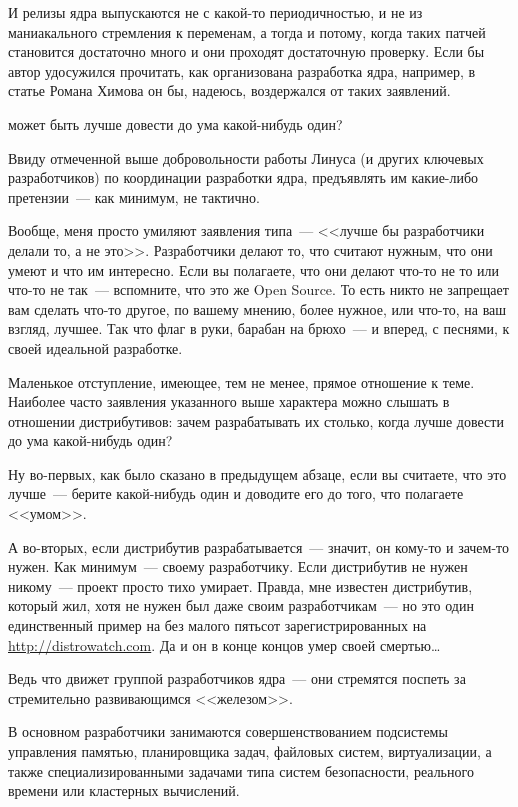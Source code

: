 И релизы ядра выпускаются не с какой-то периодичностью, и не из маниакального стремления к переменам, а тогда и потому, когда таких патчей становится достаточно много и они проходят достаточную проверку. Если бы автор удосужился прочитать, как организована разработка ядра, например, в статье Романа Химова он бы, надеюсь, воздержался от таких заявлений. 
\begin{shadequote}{}
 может быть лучше довести до ума какой-нибудь один?
\end{shadequote}
Ввиду отмеченной выше добровольности работы Линуса (и других ключевых разработчиков) по координации разработки ядра, предъявлять им какие-либо претензии~--- как минимум, не тактично. 

Вообще, меня просто умиляют заявления типа~--- <<лучше бы разработчики делали то, а не это>>. Разработчики делают то, что считают нужным, что они умеют и что им интересно. Если вы полагаете, что они делают что-то не то или что-то не так~--- вспомните, что это же Open Source. То есть никто не запрещает вам сделать что-то другое, по вашему мнению, более нужное, или что-то, на ваш взгляд, лучшее. Так что флаг в руки, барабан на брюхо~--- и вперед, с песнями, к своей идеальной разработке. 

Маленькое отступление, имеющее, тем не менее, прямое отношение к теме. Наиболее часто заявления указанного выше характера можно слышать в отношении дистрибутивов: зачем разрабатывать их столько, когда лучше довести до ума какой-нибудь один? 

Ну во-первых, как было сказано в предыдущем абзаце, если вы считаете, что это лучше~--- берите какой-нибудь один и доводите его до того, что полагаете <<умом>>. 

А во-вторых, если дистрибутив разрабатывается~--- значит, он кому-то и зачем-то нужен. Как минимум~--- своему разработчику. Если дистрибутив не нужен никому~--- проект просто тихо умирает. Правда, мне известен дистрибутив, который жил, хотя не нужен был даже своим разработчикам~--- но это один единственный пример на без малого пятьсот зарегистрированных на \url{http://distrowatch.com}. Да и он в конце концов умер своей смертью\dots
\begin{shadequote}{}
Ведь что движет группой разработчиков ядра~--- они стремятся поспеть за стремительно развивающимся <<железом>>.
\end{shadequote}
В основном разработчики занимаются совершенствованием подсистемы управления памятью, планировщика задач, файловых систем, виртуализации, а также специализированными задачами типа систем безопасности, реального времени или кластерных вычислений. 

